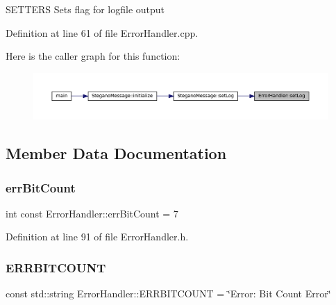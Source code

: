 S\+E\+T\+T\+E\+RS Sets flag for logfile output 

Definition at line 61 of file Error\+Handler.\+cpp.

Here is the caller graph for this function\+:
\nopagebreak
\begin{figure}[H]
\begin{center}
\leavevmode
\includegraphics[width=350pt]{classErrorHandler_aa79cfd994939c238b85ad021ea6bbe05_icgraph}
\end{center}
\end{figure}


\subsection{Member Data Documentation}
\mbox{\label{classErrorHandler_ae4e30eb033a9a5e2a04008a8be48ad67}} 
\subsubsection{\texorpdfstring{errBitCount}{errBitCount}}
{\footnotesize\ttfamily int const Error\+Handler\+::err\+Bit\+Count = 7\hspace{0.3cm}{\ttfamily [static]}}



Definition at line 91 of file Error\+Handler.\+h.

\mbox{\label{classErrorHandler_aaca2b9c33a1ad2bcc5d311cb4e5ca8f8}} 
\subsubsection{\texorpdfstring{ERRBITCOUNT}{ERRBITCOUNT}}
{\footnotesize\ttfamily const std\+::string Error\+Handler\+::\+E\+R\+R\+B\+I\+T\+C\+O\+U\+NT = \char`\"{}Error\+: Bit Count Error\char`\"{}\hspace{0.3cm}{\ttfamily [static]}}



